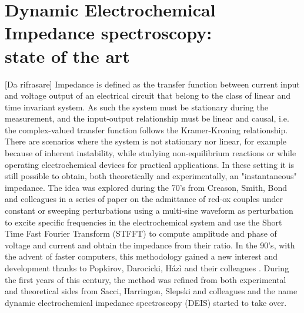 \chapter{Dynamic Electrochemical Impedance spectroscopy: \\state of the art}
\minitoc

 [Da rifrasare] 
 Impedance is defined as the transfer function between  current input and voltage output of an electrical circuit that belong to the class of linear and time invariant system. As such the system must be stationary during the measurement, and the input-output relationship must be linear and causal, i.e. the complex-valued transfer function follows the Kramer-Kroning relationship. There are scenarios where the system is not stationary nor linear, for example because of inherent instability, while studying non-equilibrium reactions or while operating electrochemical devices for practical applications. In these setting it is still possible to obtain, both theoretically and experimentally, an "instantaneous" impedance. The idea was explored during the 70's from Creason, Smith, Bond and colleagues in a series of paper on the admittance of red-ox couples  under constant or sweeping perturbations \cite{creasonFourierTransformFaradaic1972}\cite{creasonFourierTransformFaradaic1972b}\cite{creasonFourierTransformFaradaic1973a}\cite{bondOnlineFFTFaradaic1977} using a multi-sine waveform as perturbation to excite specific frequencies in the electrochemical system and use the Short Time Fast Fourier Transform (STFFT) to compute amplitude and phase of voltage and current and obtain the impedance from their ratio. In the 90's, with the advent of faster computers, this methodology gained a new interest and development thanks to Popkirov, Darocicki, Házì and their colleagues \cite{popkirovNewImpedanceSpectrometer1992}\cite{popkirovValidationExperimentalData1993}\cite{darowickiFrequencyDispersionHarmonic1995}\cite{haziMicrocomputerbasedInstrumentationMultifrequency1997}\cite{schieweUnifiedApproachTrace1998}.
During the first years of this century, the method was refined from both experimental \cite{darowickiInfluenceAnalyzingWindow2002}\cite{sacciDynamicElectrochemicalImpedance2009}\cite{slepskiOnlineMeasurementCell2009} and theoretical \cite{darowickiInstantaneousImpedanceSpectra2000} \cite{darowickiTheoreticalDescriptionMeasuring2000} sides from Sacci, Harringon, Slepski and colleagues and the name dynamic electrochemical impedance spectroscopy (DEIS) started to take over.

